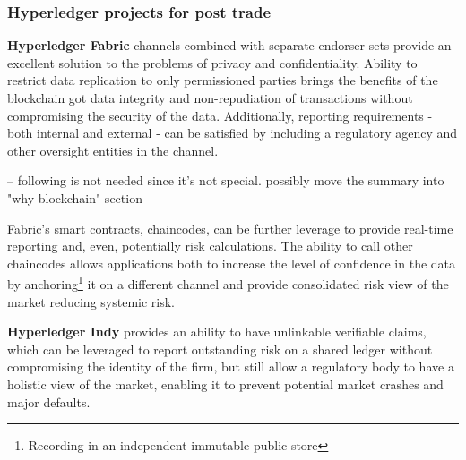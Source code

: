 \subsubsection{Hyperledger projects for post trade}
\textbf{Hyperledger Fabric} channels combined with separate endorser sets provide an excellent solution to the problems of privacy and confidentiality. Ability to restrict data replication to only permissioned parties brings the benefits of the blockchain got data integrity and non-repudiation of transactions without compromising the security of the data. Additionally, reporting requirements - both internal and external - can be satisfied by including a regulatory agency and other oversight entities in the channel.

-- following is not needed since it's not special. possibly move the summary into "why blockchain" section

Fabric's smart contracts, chaincodes, can be further leverage to provide real-time reporting and, even, potentially risk calculations. The ability to call other chaincodes allows applications both to increase the level of confidence in the data by anchoring\footnote{Recording in an independent immutable public store} it on a different channel and provide consolidated risk view of the market reducing systemic risk.

\textbf{Hyperledger Indy} provides an ability to have unlinkable verifiable claims, which can be leveraged to report outstanding risk on a shared ledger without compromising the identity of the firm, but still allow a regulatory body to have a holistic view of the market, enabling it to prevent potential market crashes and major defaults.
